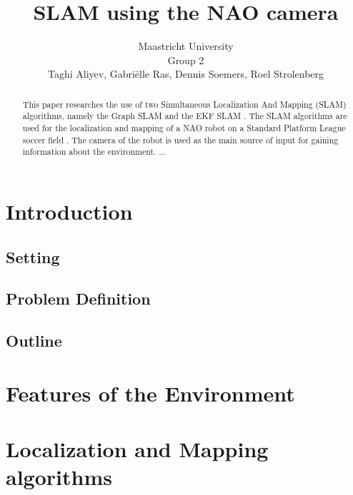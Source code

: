 \documentclass{ba-kecs}
\title{SLAM using the NAO camera}
\author{Maastricht University \\ Group 2 \\ Taghi Aliyev, Gabri\"elle Ras, Dennis Soemers, Roel Strolenberg}
\numberwithin{figure}{section}
\numberwithin{equation}{section}
\begin{document}
\maketitle


\begin{abstract}

This paper researches the use of two Simultaneous Localization And Mapping (SLAM) algorithms, namely the Graph SLAM \cite{Cd1} and the EKF SLAM \cite{Cd2}. The SLAM algorithms are used for the localization and mapping of a NAO robot on a Standard Platform League soccer field \cite{Cd3}. The camera of the robot is used as the main source of input for gaining information about the environment.
...

\end{abstract}


\section{Introduction}


\subsection{Setting}



\subsection{Problem Definition}


\subsection{Outline}



\section{Features of the Environment}


\section{Localization and Mapping algorithms}
\end{document}
